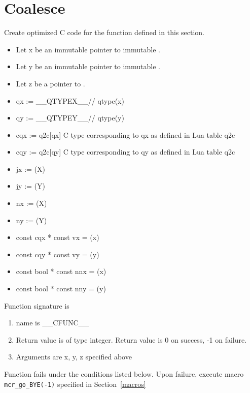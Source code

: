 \newcommand{\cfunc}{__CFUNC__}
\newcommand{\qtypex}{__QTYPEX__}
\newcommand{\qtypey}{__QTYPEY__}
\section{Coalesce}
\label{coalesce}

Create optimized C code for the function defined in this section.

\begin{itemize}
  \item Let x be an immutable pointer to immutable \qdf.
  \item Let y be an immutable pointer to immutable \qdf.
  \item Let z be a            pointer to           \qdf.
  \item qx  :=  \qtypex // qtype(x)
  \item qy  :=  \qtypey // qtype(y)
  \item cqx := q2c[qx] C type corresponding to qx as defined in Lua table q2c
  \item cqy := q2c[qy] C type corresponding to qy as defined in Lua table q2c
\item jx  := \getj(X)
\item jy  := \getj(Y)
\item nx := \getn(X)
\item ny := \getn(Y)
\item const cqx * const vx = \getrv(x)
\item const cqy * const vy = \getrv(y)
\item const bool * const nnx = \getrnn(x)
\item const bool * const nny = \getrnn(y)
\end{itemize}


Function signature is 
\begin{enumerate}
  \item name is \cfunc
  \item Return value is of type integer. 
    Return value is 0 on success, -1 on failure.
  \item Arguments are x, y, z specified above
\end{enumerate}


Function fails under the conditions listed below. Upon failure, 
execute macro \verb+mcr_go_BYE(-1)+ specified in Section~\ref{macros}

